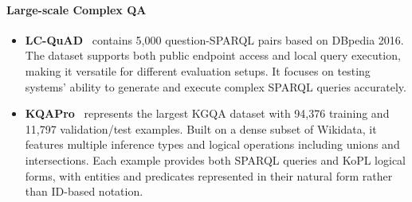 \documentclass[lettersize,journal]{IEEEtran}
\begin{document}
\paragraph{Large-scale Complex QA}
\begin{itemize}
    \item \textbf{LC-QuAD}~\cite{trivedi2017lc} contains 5,000 question-SPARQL pairs based on DBpedia 2016. The dataset supports both public endpoint access and local query execution, making it versatile for different evaluation setups. It focuses on testing systems' ability to generate and execute complex SPARQL queries accurately.
    \item \textbf{KQAPro}~\cite{cao2020kqa} represents the largest KGQA dataset with 94,376 training and 11,797 validation/test examples. Built on a dense subset of Wikidata, it features multiple inference types and logical operations including unions and intersections. Each example provides both SPARQL queries and KoPL logical forms, with entities and predicates represented in their natural form rather than ID-based notation.
\end{itemize}
\end{document}
